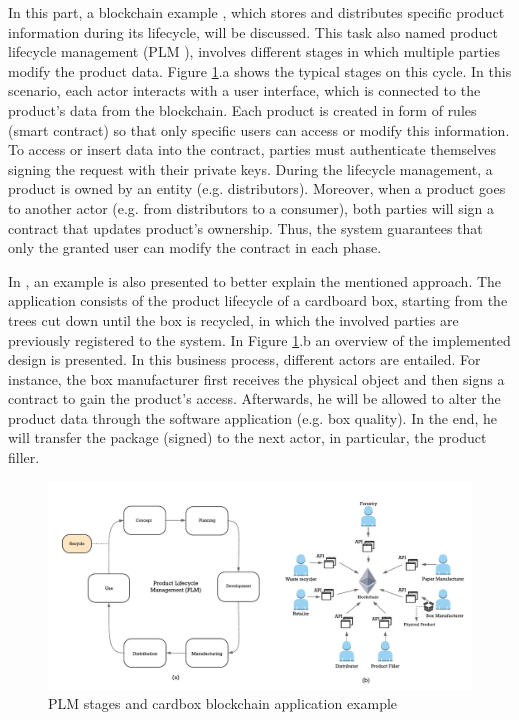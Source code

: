 In this part, a blockchain example \citep{abeyratne2016blockchain}, which stores and distributes specific product information during its lifecycle, will be discussed. This task also named product lifecycle management (PLM \citep{stark2015product}), involves different stages in which multiple parties modify the product data. Figure \ref{fig:supplyChain}.a shows the typical stages on this cycle. In this scenario, each actor interacts with a user interface, which is connected to the product's data from the blockchain. Each product is created in form of rules (smart contract) so that only specific users can access or modify this information. To access or insert data into the contract, parties must authenticate themselves signing the request with their private keys. During the lifecycle management, a product is owned by an entity (e.g. distributors). Moreover, when a product goes to another actor (e.g. from distributors to a consumer), both parties will sign a contract that updates product's ownership. Thus, the system guarantees that only the granted user can modify the contract in each phase.

In \citep{abeyratne2016blockchain}, an example is also presented to better explain the mentioned approach. The application consists of the product lifecycle of a cardboard box, starting from the trees cut down until the box is recycled, in which the involved parties are previously registered to the system. In Figure \ref{fig:supplyChain}.b an overview of the implemented design is presented. In this business process, different actors are entailed. For instance, the box manufacturer first receives the physical object and then signs a contract to gain the product's access. Afterwards, he will be allowed to alter the product data through the software application (e.g. box quality). In the end, he will transfer the package (signed) to the next actor, in particular, the product filler.

\begin{figure}
	\centering
	\includegraphics[width=1\linewidth]{gfx/supplyChain}    
  \caption{ PLM stages and cardbox blockchain application example \citep{stark2015product}}
  \label{fig:supplyChain}
\end{figure}


